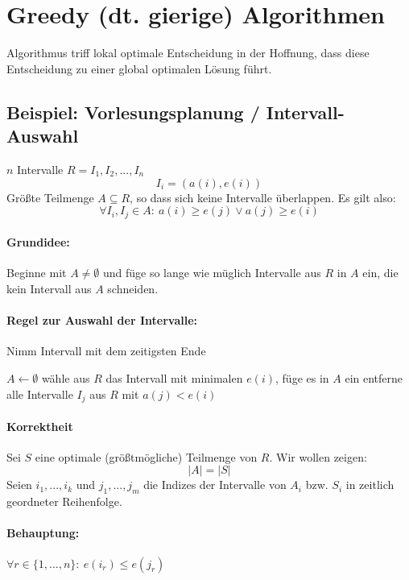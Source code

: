 \section[Greedy Algorithmen]{Greedy (dt. gierige) Algorithmen}
Algorithmus triff lokal optimale Entscheidung in der Hoffnung, dass diese Entscheidung zu einer global optimalen Lösung führt.

\subsection{Beispiel: Vorlesungsplanung / Intervall-Auswahl}
\Geg     $n$ Intervalle $R = {I_1, I_2, ..., I_n}$
         \[I_i = (a(i), e(i))\]
\Ges     Größte Teilmenge $A \subseteq R$, so dass sich keine Intervalle überlappen.
         Es gilt also:
         \[ \forall I_i, I_j \in A{:}\ a(i) \geq e(j) \lor a(j) \geq e(i) \]
\paragraph*{Grundidee:} Beginne mit $A \neq \emptyset$ und füge so lange wie müglich Intervalle aus $R$ in $A$ ein, die kein Intervall aus $A$ schneiden.

\paragraph*{Regel zur Auswahl der Intervalle:} Nimm Intervall mit dem zeitigsten Ende
\begin{algorithmic}
 \STATE $A \gets \emptyset$
 \STATE wähle aus $R$ das Intervall mit minimalen $e(i)$, füge es in $A$ ein
 \STATE entferne alle Intervalle $I_j$ aus $R$ mit $a(j) < e(i)$
 \ENDWHILE
\end{algorithmic}

\paragraph*{Korrektheit} Sei $S$ eine optimale (größtmögliche) Teilmenge von $R$. Wir wollen zeigen: 
\[|A| = |S|\]
Seien $i_1,...,i_k$ und $j_1,...,j_m$ die Indizes der Intervalle von $A_i$ bzw. $S_i$ in zeitlich geordneter Reihenfolge.

\paragraph*{Behauptung:} $\forall r \in \{1,...,n\}{:}\ e(i_r) \leq e(j_r)$

